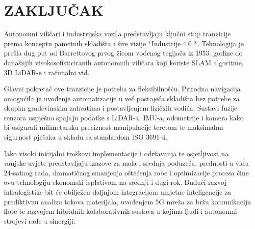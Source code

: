 \section{ZAKLJUČAK}
Autonomni viličari i industrijska vozila predstavljaju ključni stup tranzicije prema konceptu pametnih skladišta i šire vizije *Industrije 4.0 \cite{kion}*. Tehnologija je prešla dug put od Barrettovog prvog žicom vođenog tegljača iz 1953. godine do današnjih visokosofisticiranih autonomnih viličara koji koriste SLAM algoritme, 3D LiDAR-e i računalni vid.

Glavni pokretač ove tranzicije je potreba za fleksibilnošću. Prirodna navigacija omogućila je uvođenje automatizacije u već postojeća skladišta bez potrebe za skupim građevinskim zahvatima i postavljenjem fizičkih vodiča. Sustavi fuzije senzora uspješno spajaju podatke s LiDAR-a, IMU-a, odometrije i kamera kako bi osigurali milimetarsku preciznost manipulacije teretom te maksimalnu sigurnost pješaka u skladu sa standardom ISO 3691-4.

Iako visoki inicijalni troškovi implementacije i održavanja te osjetljivost na vanjske uvjete predstavljaju izazove za mala i srednja poduzeća, prednosti u vidu 24-satnog rada, dramatičnog smanjenja oštećenja robe i optimizacije procesa čine ovu tehnologiju ekonomski isplativom na srednji i dugi rok. Budući razvoj intralogistike bit će obilježen daljnjom integracijom umjetne inteligencije za prediktivnu analizu tokova materijala, uvođenjem 5G mreža za bržu komunikaciju flote te razvojem hibridnih kolaborativnih sustava u kojima ljudi i autonomni strojevi rade u sinergiji.
